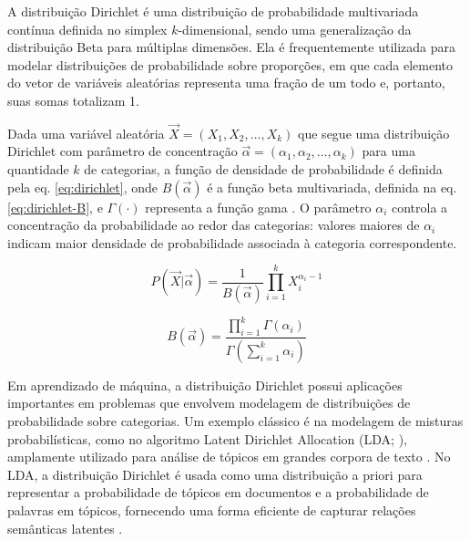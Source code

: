A distribuição Dirichlet \cite{distbook-dirichlet} é uma distribuição de probabilidade multivariada contínua definida no simplex \( k \)-dimensional, sendo uma generalização da distribuição Beta \cite{distbook-beta} para múltiplas dimensões. Ela é frequentemente utilizada para modelar distribuições de probabilidade sobre proporções, em que cada elemento do vetor de variáveis aleatórias representa uma fração de um todo e, portanto, suas somas totalizam 1.

Dada uma variável aleatória \( \vec{X} = (X_1, X_2, \dots, X_k) \) que segue uma distribuição Dirichlet com parâmetro de concentração \( \vec{\alpha} = (\alpha_1, \alpha_2, \dots, \alpha_k) \) para uma quantidade $k$ de categorias, a função de densidade de probabilidade é definida pela eq. \eqref{eq:dirichlet}, onde \( B(\vec{\alpha}) \) é a função beta multivariada, definida na eq. \eqref{eq:dirichlet-B}, e \( \Gamma(\cdot) \) representa a função gama \cite{distbook-gamma}. O parâmetro \( \alpha_i \) controla a concentração da probabilidade ao redor das categorias: valores maiores de \( \alpha_i \) indicam maior densidade de probabilidade associada à categoria correspondente.

\begin{equation}\label{eq:dirichlet}
  P(\vec{X} | \vec{\alpha}) = \frac{1}{B (\vec{\alpha})} \prod_{i=1}^k X_i^{\alpha_i - 1}
\end{equation}

\begin{equation}\label{eq:dirichlet-B}
  B(\vec{\alpha}) = \frac{\prod_{i=1}^k \Gamma(\alpha_i)}{\Gamma\left(\sum_{i=1}^k \alpha_i\right)}
\end{equation}


Em aprendizado de máquina, a distribuição Dirichlet possui aplicações importantes em problemas que envolvem modelagem de distribuições de probabilidade sobre categorias. Um exemplo clássico é na modelagem de misturas probabilísticas, como no algoritmo Latent Dirichlet Allocation (LDA; \citealp{lda}), amplamente utilizado para análise de tópicos em grandes corpora de texto \cite{jelodar2019}. No LDA, a distribuição Dirichlet é usada como uma distribuição a priori para representar a probabilidade de tópicos em documentos e a probabilidade de palavras em tópicos, fornecendo uma forma eficiente de capturar relações semânticas latentes \cite{canini2009}.


